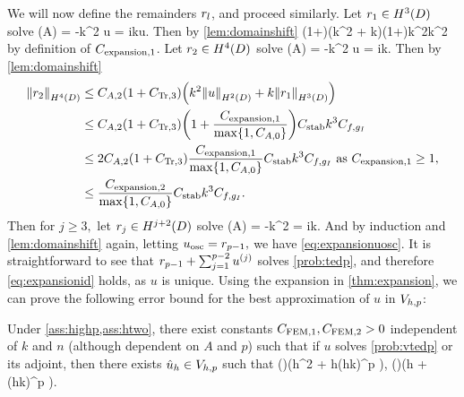 We will now define the remainders $r_{l}$, and proceed similarly.
Let $\ro \in \HthD$ solve
\beqs
\grad \cdot \mleft(A\grad \ro\mright) = -k^2 u \tand \dn \ro = ik\trGI u.
\eeqs
Then by \cref{lem:domainshift}
\beqs%
\NHthD{\ro} \leq \CAo\mleft(1+\CTrt\mright)\mleft(k^2 + k\mright)\leq \CAo\mleft(1+\CTrt\mright)k^2\CAnk\Cfg\leq {}k^2\CAnk \Cfg
\eeqs%
by definition of $C_{\mathrm{expansion},1}$.
Let $\rt \in \HfD$ solve
\beqs
\grad \cdot \mleft(A\grad \rt\mright) = -k^2 u \tand \dn \rt = ik\trGI \ro.
\eeqs
Then by \cref{lem:domainshift}
\begin{align*}
\NHfD{\rt} &\leq \CAt\mleft(1+\CTrth\mright)\mleft(k^2\NHtD{u} + k\NHthD{\ro}\mright)\\
&\leq \CAt\mleft(1+\CTrth\mright)\mleft(1 + \frac{\Cefn{1}}{\max\set{1,\CAz}}\mright)\CAnk k^3\Cfg\\
&\leq 2\CAt\mleft(1+\CTrth\mright)\frac{\Cefn{1}}{\max\set{1,\CAz}}\CAnk k^3 \Cfg\text{ as } \Cefn{1} \geq 1,\\
&\leq \frac{\Cefn{2}}{\max\set{1,\CAz}}\CAnk k^3\Cfg.
\end{align*}
Then for $j \geq 3,$ let $\rj \in \HjptD$ solve
\beqs
\grad \cdot \mleft(A\grad \rt\mright) = -k^2 \rjmt \tand \dn \rj = ik\trGI\rjmo.
\eeqs
And by induction and \cref{lem:domainshift} again, letting $u_{\mathrm{osc}} = r_{p-1},$ we have \cref{eq:expansionuosc}. It is straightforward to see that $r_{p-1} + \sum_{j=1}^{p-2} u^{(j)}$ solves \cref{prob:tedp}, and therefore \cref{eq:expansionid} holds, as $u$ is unique.
\epf
Using the expansion in \cref{thm:expansion}, we can prove the following error bound for the best approximation of $u$ in $V_{h,p}$:


\label{lem:bestapprox}
Under \cref{ass:highp,ass:htwo}, there exist constants $C_{\mathrm{FEM},1}, C_{\mathrm{FEM},2} > 0$ independent of $k$ and $n$ (although dependent on $A$ and $p$) such that if $u$ solves \cref{prob:vtedp} or its adjoint, then there exists $\hat{u}_{h} \in V_{h,p}$ such that
\beq\label{eq:bestapproxL2}
 \leq {}\mleft(\mright)\mleft(\CFEMo  h^2 + \CFEMt \CAnk h\mleft(hk\mright)^p \mright)\Cfg,
\eeq
\beq\label{eq:bestapproxW}
 \mleft(\mright)\mleft(\CFEMo  h + \CFEMt \CAnk \mleft(hk\mright)^p \mright)\Cfg.
\eeq
\ele

